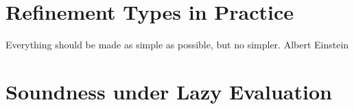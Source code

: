 \chapter{Refinement Types in Practice}\label{chapter:tool}
\makequote
{Everything should be made as simple as possible, but no simpler.}
{Albert Einstein}


\begin{comment}
“One day I will find the right words, and they will be simple.” 
― Jack Kerouac, The Dharma Bums


“Life is really simple, but we insist on making it complicated.” ~ Confucius

“Knowledge is a process of piling up facts; wisdom lies in their simplification.” ~ Martin H. Fischer


“If you can’t explain it to a six year old, you don’t understand it yourself.” ~ Albert Einstein
\end{comment}










\chapter{Soundness under Lazy Evaluation}\label{chapter:refinedhaskell}











